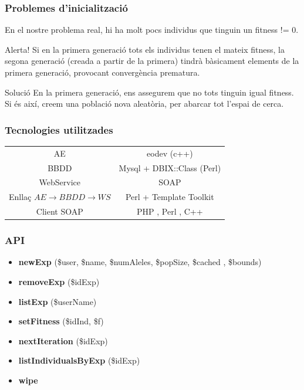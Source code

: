\documentclass{beamer}
\begin{document}
\begin{frame}
\frametitle{Problemes d'inicialització}
En el nostre problema real, hi ha molt pocs individus que tinguin un fitness !=
0.
\pause
\begin{alertblock}{Alerta!}
Si en la primera generació tots els individus tenen el mateix fitness, la segona
generació (creada a partir de la primera) tindrà bàsicament elements de la
primera generació, provocant convergència prematura.
\end{alertblock}
\pause
\begin{exampleblock}{Solució}
En la primera generació, ens assegurem que no tots tinguin igual fitness.  Si és
així, creem una població nova aleatòria, per abarcar tot l'espai de cerca.
\end{exampleblock}
\end{frame}

\begin{frame}
\frametitle{Tecnologies utilitzades}
\begin{tabular}[h!]{|c|c|}
AE & eodev (c++) \\
BBDD & Mysql + DBIX::Class (Perl) \\
WebService & SOAP \\
Enllaç $AE\rightarrow BBDD\rightarrow WS$ & Perl + Template Toolkit\\
Client SOAP & PHP , Perl , C++ \\
\end{tabular}
\end{frame}

\begin{frame}
	\frametitle{API}
	\begin{itemize}
		\item \textbf{newExp} (\$user, \$name, \$numAleles, \$popSize, \$cached , \$bounds)
		\item \textbf{removeExp} (\$idExp)
		\item \textbf{listExp} (\$userName)
		\item \textbf{setFitness} (\$idInd, \$f)
		\item \textbf{nextIteration} (\$idExp)
		\item \textbf{listIndividualsByExp} (\$idExp)
		\item \textbf{wipe}
	\end{itemize}
\end{frame}
\end{document}
